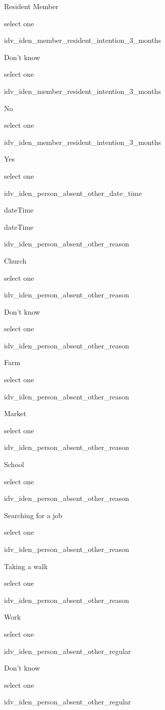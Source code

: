 \documentclass[]{article}
\begin{document}
Resident Member

select one

idv\_iden\_member\_resident\_intention\_3\_months

Don't know

select one

idv\_iden\_member\_resident\_intention\_3\_months

No

select one

idv\_iden\_member\_resident\_intention\_3\_months

Yes

select one

idv\_iden\_person\_absent\_other\_date\_time

dateTime

dateTime

idv\_iden\_person\_absent\_other\_reason

Church

select one

idv\_iden\_person\_absent\_other\_reason

Don't know

select one

idv\_iden\_person\_absent\_other\_reason

Farm

select one

idv\_iden\_person\_absent\_other\_reason

Market

select one

idv\_iden\_person\_absent\_other\_reason

School

select one

idv\_iden\_person\_absent\_other\_reason

Searching for a job

select one

idv\_iden\_person\_absent\_other\_reason

Taking a walk

select one

idv\_iden\_person\_absent\_other\_reason

Work

select one

idv\_iden\_person\_absent\_other\_regular

Don't know

select one

idv\_iden\_person\_absent\_other\_regular
\end{document}
